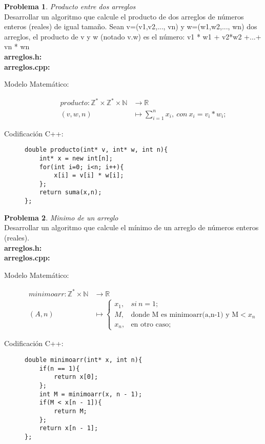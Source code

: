 \documentclass{article}
\theoremstyle{plain}
\theoremstyle{definition}
\newtheorem{problem}{Problema}
\begin{document}
\begin{problem} \emph{Producto entre dos arreglos}\\
Desarrollar un algoritmo que calcule el producto de dos arreglos de números enteros (reales) de igual tamaño. Sean v=(v1,v2,..., vn) y w=(w1,w2,..., wn) dos arreglos, el producto de v y w (notado v.w) es el número: v1 * w1 + v2*w2 +...+ vn * wn\\
\textbf{arreglos.h:}\ \\
\textbf{arreglos.cpp:}\ 
%
\begin{description}
\item[Modelo Matemático:]
%
\begin{align*}
producto: \mathbb{Z}^*\times\mathbb{Z}^*\times\mathbb{N} &\to \mathbb{R}\\
(v,w,n) &\mapsto \sum_{i=1}^n x_i,\ con\ x_i = v_i * w_i;
\end{align*}
%
\item[Codificación \textsf{C++}:]\hfill
%
\begin{verbatim}
double producto(int* v, int* w, int n){
    int* x = new int[n];
    for(int i=0; i<n; i++){
        x[i] = v[i] * w[i];
    };
    return suma(x,n);
};
\end{verbatim}
\end{description}
\end{problem}

\begin{problem} \emph{Minimo de un arreglo}\\
Desarrollar un algoritmo que calcule el mínimo de un arreglo de números enteros (reales).\\
\textbf{arreglos.h:}\ \\
\textbf{arreglos.cpp:}\ 
%
\begin{description}
\item[Modelo Matemático:]
%
\begin{align*}
minimoarr:\mathbb{Z}^*\times\mathbb{N} &\to \mathbb{R}\\
(A,n) &\mapsto 
\begin{cases}
x_1,& si\ n=1;\\
M,& \text{donde M es minimoarr(a,n-1) y M}<x_n\\
x_n,& \text{en otro caso;}
\end{cases}
\end{align*}
%
\item[Codificación \textsf{C++}:]\hfill
%
\begin{verbatim}
double minimoarr(int* x, int n){
    if(n == 1){
        return x[0];
    };
    int M = minimoarr(x, n - 1);
    if(M < x[n - 1]){
        return M;
    };
    return x[n - 1];
};
\end{verbatim}
\end{description}
\end{problem}
\end{document}
